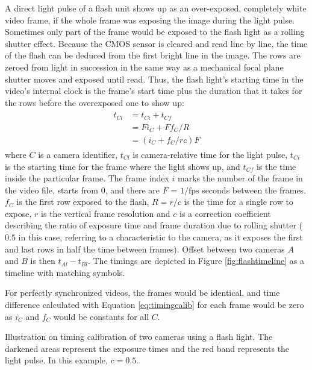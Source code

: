 A direct light pulse of a flash unit shows up as an over-exposed, completely white video frame, if the whole frame was exposing the image during the light pulse.
Sometimes only part of the frame would be exposed to the flash light as a rolling shutter effect.
Because the CMOS sensor is cleared and read line by line, the time of the flash can be deduced from the first bright line in the image.
The rows are zeroed from light in succession in the same way as a mechanical focal plane shutter moves and exposed until read.
Thus, the flash light's starting time in the video's internal clock is the frame's start time plus the duration that it takes for the rows before the overexposed one to show up:
\begin{align} \begin{split} \label{eq:timingcalib}
t_{Cl} &= t_{Ci} + t_{Cf} \\
&= F i_C + F f_C / R \\
&= (i_C + f_C / r c) F
\end{split} \end{align}
where $C$ is a camera identifier, $t_{Cl}$ is camera-relative time for the light pulse, $t_{Ci}$ is the starting time for the frame where the light shows up, and $t_{Cf}$ is the time inside the particular frame.
The frame index $i$ marks the number of the frame in the video file, starts from 0, and there are $F$ = $1/\text{fps}$ seconds between the frames.
$f_C$ is the first row exposed to the flash, $R = r / c$ is the time for a single row to expose, $r$ is the vertical frame resolution and $c$ is a correction coefficient describing the ratio of exposure time and frame duration due to rolling shutter ($0.5$ in this case, referring to a characteristic to the camera, as it exposes the first and last rows in half the time between frames).
Offset between two cameras $A$ and $B$ is then $t_{Al} - t_{Bl}$.
The timings are depicted in Figure \ref{fig:flashtimeline} as a timeline with matching symbols.

For perfectly synchronized videos, the frames would be identical, and time difference calculated with Equation \ref{eq:timingcalib} for each frame would be zero as $i_C$ and $f_C$ would be constants for all $C$.

{Illustration on timing calibration of two cameras using a flash light.
The darkened areas represent the exposure times and the red band represents the light pulse.
In this example, $c = 0.5$.
}


